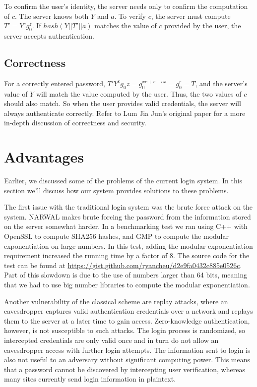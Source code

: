 \documentclass[11pt]{article}
\begin{document}
To confirm the user’s identity, the server needs only to confirm the computation of $c$.  The server knows both $Y$ and $a$.  To verify $c$, the server must compute $T' = Y^cg_0^z$.  If $hash(Y || T' || a)$ matches the value of $c$ provided by the user, the server accepts authentication.\cite{Lum}

\subsection{Correctness}

For a correctly entered password, $T' Y^cg_0z = g_0^{xc + r - cx} = g_0^r = T$, and the server’s value of $Y$ will match the value computed by the user.  Thus, the two values of $c$ should also match.  So when the user provides valid credentials, the server will always authenticate correctly.  Refer to Lum Jia Jun’s original paper for a more in-depth discussion of correctness and security.


\section{Advantages}

Earlier, we discussed some of the problems of the current login system.  In this section we’ll discuss how our system provides solutions to these problems.

The first issue with the traditional login system was the brute force attack on the system.  NARWAL makes brute forcing the password from the information stored on the server somewhat harder.  In a benchmarking test we ran using C++ with OpenSSL to compute SHA256 hashes, and GMP to compute the modular exponentiation on large numbers.  In this test, adding the modular exponentiation requirement increased the running time by a factor of 8. The source code for the test can be found at \url{https://gist.github.com/ryancheu/d2e9fa0432c885e0526c}.  Part of this slowdown is due to the use of numbers larger than 64 bits, meaning that we had to use big number libraries to compute the modular exponentiation.

Another vulnerability of the classical scheme are replay attacks, where an eavesdropper captures valid authentication credentials over a network and replays them to the server at a later time to gain access. Zero-knowledge authentication, however, is not susceptible to such attacks.  The login process is randomized, so intercepted credentials are only valid once and in turn do not allow an eavesdropper access with further login attempts.  The information sent to login is also not useful to an adversary without significant computing power.  This means that a password cannot be discovered by intercepting user verification, whereas many sites currently send login information in plaintext.
\end{document}
